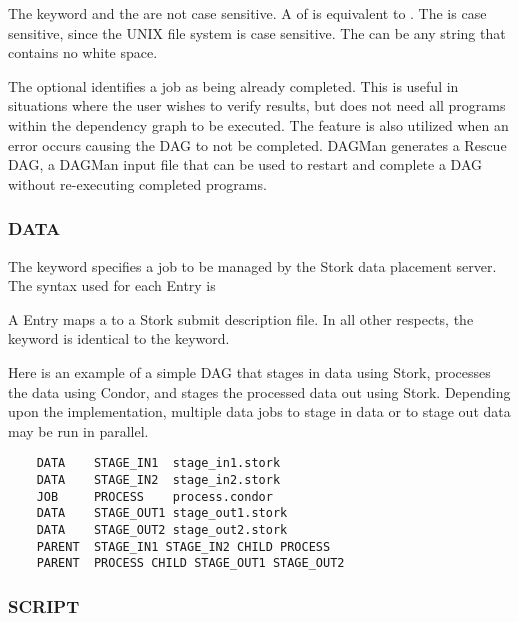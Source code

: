 The keyword  and the  are not case sensitive.
A  of  is equivalent to .
The  is case sensitive, since
the UNIX file system is case sensitive.
The  can be any string that contains no white space.

The optional  identifies a job as being already
completed.
This is useful in situations where the user wishes to verify results,
but does not need all programs within the dependency graph to be executed.
The  feature is also utilized when
an error occurs causing the DAG to not be completed.
DAGMan generates a Rescue DAG, a DAGMan input file that can be
used to restart and complete a DAG without re-executing
completed programs.

\subsubsection{\label{dagman:DATA}DATA}

The  keyword specifies a job to be managed by the Stork data
placement server.  
The syntax used for each  Entry is

   

A  Entry maps a  to a Stork submit description file.
In all other respects, the  keyword is identical to the
 keyword.

Here is an example of a simple DAG that stages in data using Stork,
processes the data using Condor, 
and stages the processed data out using Stork.
Depending upon the implementation, multiple data jobs to stage in data
or to stage out data
may be run in parallel.

\footnotesize
\begin{verbatim}
    DATA    STAGE_IN1  stage_in1.stork
    DATA    STAGE_IN2  stage_in2.stork
    JOB     PROCESS    process.condor 
    DATA    STAGE_OUT1 stage_out1.stork
    DATA    STAGE_OUT2 stage_out2.stork
    PARENT  STAGE_IN1 STAGE_IN2 CHILD PROCESS
    PARENT  PROCESS CHILD STAGE_OUT1 STAGE_OUT2
\end{verbatim}
\normalsize

\subsubsection{SCRIPT}

